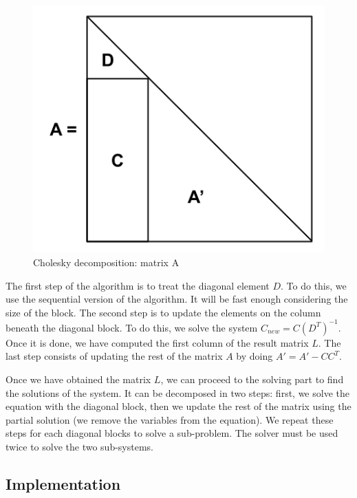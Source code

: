 \begin{figure}[h!]
  \begin{center}
    \includegraphics[scale=0.4]{img/cho_block_dec_A.png}
    \caption{Cholesky decomposition: matrix A}
    \label{fig:chodeca}
  \end{center}
\end{figure}

The first step of the algorithm is to treat the diagonal element $D$. To do
this, we use the sequential version of the algorithm. It will be fast enough
considering the size of the block. The second step is to update the elements on
the column beneath the diagonal block. To do this, we solve the system $C_{new}
= C(D^{T})^{-1}$. Once it is done, we have computed the first column of the
result matrix $L$. The last step consists of updating the rest of the matrix $A$
by doing $A' = A' - CC^{T}$.

Once we have obtained the matrix $L$, we can proceed to the solving part to find
the solutions of the system. It can be decomposed in two steps: first, we solve
the equation with the diagonal block, then we update the rest of the matrix
using the partial solution (we remove the variables from the equation). We
repeat these steps for each diagonal blocks to solve a sub-problem. The solver
must be used twice to solve the two sub-systems.

\subsection{Implementation}

